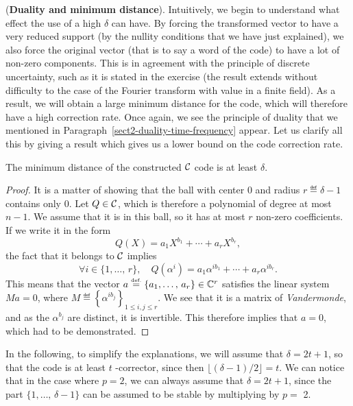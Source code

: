 \begin{rem}{(\upshape \textbf{Duality and minimum distance}).}
 Intuitively, we begin to understand what effect the use of a high $ \delta $ can have. By forcing the transformed vector to have a very reduced support (by the nullity conditions that we have just explained), we also force the original vector (that is to say a word of the code) to have a lot of non-zero components. This is in agreement with the principle of discrete uncertainty, such as it is stated in the exercise  (the result extends without difficulty to the case of the Fourier transform with value in a finite field). As a result, we will obtain a large minimum distance for the code, which will therefore have a high correction rate. Once again, we see the principle of duality that we mentioned in Paragraph~\ref{sect2-duality-time-frequency} appear. Let us clarify all this by giving a result which gives us a lower bound on the code correction rate.
\end{rem}
 
 
\begin{prop}
\label{prop-dist-minimal-code-bch}
The minimum distance of the constructed $ \mathcal{C} $ code is at least $ \delta $.
\end{prop}
\begin{proof}
 It is a matter of showing that the ball with center $ 0 $ and radius $ r \eqdef \delta-1 $ contains only $ 0 $. Let $ Q \in \mathcal{C} $, which is therefore a polynomial of degree at most $ n-1 $. We assume that it is in this ball, so it has at most $ r $ non-zero coefficients. If we write it in the form
\begin{equation*}
Q (X) = a_1 X^{b_1} + \cdots + a_{r} X^{b_{r}},
\end{equation*}
the fact that it belongs to $ \mathcal{C} $ implies
\begin{equation*}
\forall i \in \{1, \ldots, \, r\}, \quad Q (\alpha^i) = a_1 \alpha^{i b_1} + \cdots + a_{r} \alpha^{i b_{r}}.
\end{equation*}
This means that the vector $ a \stackrel{\mbox{\upshape\tiny def.}}{=} \{a_1, \ldots, \, a_r\} \in \mathbb{C}^r $ satisfies the linear system $ M a = 0 $, where $ M \eqdef \left\{\alpha^{i b_j} \right\}_{1 \leq i, j \leq r} $. We see that it is a matrix of \textit{Vandermonde}, and as the $ \alpha^{b_j} $ are distinct, it is invertible. This therefore implies that $ a = 0 $, which had to be demonstrated.
\end{proof}
In the following, to simplify the explanations, we will assume that $ \delta = 2 t + 1 $, so that the code is at least $ t $ -corrector, since then $ \lfloor (\delta-1) / 2 \rfloor = t $. We can notice that in the case where $ p = 2 $, we can always assume that $ \delta = 2 t + 1 $, since the part $ \{1, \ldots, \, \delta-1\} $ can be assumed to be stable by multiplying by $ p = $ 2.
